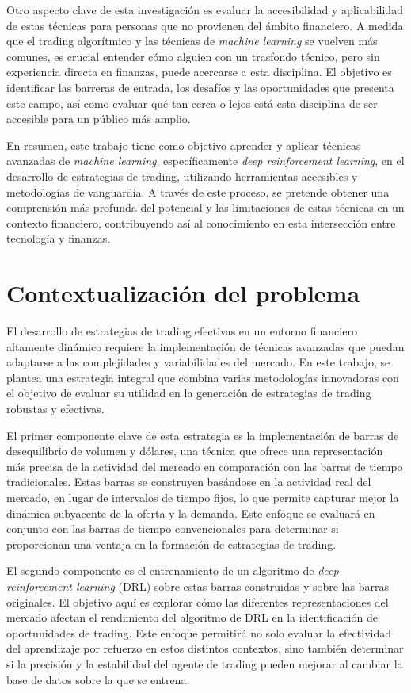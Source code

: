 \documentclass[a4paper,12pt, twoside]{report}
\begin{document}
Otro aspecto clave de esta investigación es evaluar la accesibilidad y aplicabilidad de estas 
técnicas para personas que no provienen del ámbito financiero. A medida que el trading algorítmico 
y las técnicas de \textit{machine learning} se vuelven más comunes, es crucial entender cómo alguien 
con un trasfondo técnico, pero sin experiencia directa en finanzas, puede acercarse a esta disciplina. 
El objetivo es identificar las barreras de entrada, los desafíos y las oportunidades que presenta 
este campo, así como evaluar qué tan cerca o lejos está esta disciplina de ser accesible para un 
público más amplio.

En resumen, este trabajo tiene como objetivo aprender y aplicar técnicas avanzadas de 
\textit{machine learning}, específicamente \textit{deep reinforcement learning}, en el desarrollo 
de estrategias de trading, utilizando herramientas accesibles y metodologías de vanguardia. A través 
de este proceso, se pretende obtener una comprensión más profunda del potencial y las limitaciones 
de estas técnicas en un contexto financiero, contribuyendo así al conocimiento en esta intersección 
entre tecnología y finanzas.


\section{Contextualización del problema}

El desarrollo de estrategias de trading efectivas en un entorno financiero altamente dinámico 
requiere la implementación de técnicas avanzadas que puedan adaptarse a las complejidades y 
variabilidades del mercado. En este trabajo, se plantea una estrategia integral que combina 
varias metodologías innovadoras con el objetivo de evaluar su utilidad en la generación de 
estrategias de trading robustas y efectivas.

El primer componente clave de esta estrategia es la implementación de barras de desequilibrio 
de volumen y dólares, una técnica que ofrece una representación más precisa de la actividad 
del mercado en comparación con las barras de tiempo tradicionales. Estas barras se 
construyen basándose en la actividad real del mercado, en lugar de intervalos de tiempo fijos, 
lo que permite capturar mejor la dinámica subyacente de la oferta y la demanda. Este enfoque 
se evaluará en conjunto con las barras de tiempo convencionales para determinar si proporcionan 
una ventaja en la formación de estrategias de trading.

El segundo componente es el entrenamiento de un algoritmo de \textit{deep reinforcement learning} 
(DRL) sobre estas barras construidas y sobre las barras originales. El objetivo aquí es explorar 
cómo las diferentes representaciones del mercado afectan el rendimiento del algoritmo de DRL 
en la identificación de oportunidades de trading. Este enfoque permitirá no solo evaluar la 
efectividad del aprendizaje por refuerzo en estos distintos contextos, sino también determinar 
si la precisión y la estabilidad del agente de trading pueden mejorar al cambiar la base de 
datos sobre la que se entrena.
\end{document}
